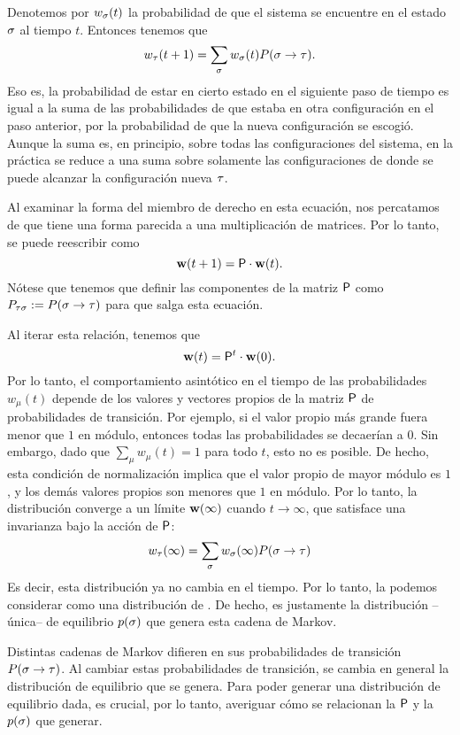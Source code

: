 Denotemos por $w_\ss(t)$ la probabilidad de que el sistema se encuentre en el estado $\ss$ al tiempo $t$. Entonces tenemos que
\begin{equation}
 w_\tt(t+1) = \sum_{\ss} w_\ss(t) P(\ss \to \tt).
\end{equation}
Eso es, la probabilidad de estar en cierto estado en el siguiente paso de tiempo es igual a la suma de las probabilidades de que estaba en otra configuración en el paso anterior, por la probabilidad de que la nueva configuración se escogió.
Aunque la suma es, en principio, sobre todas las configuraciones del sistema, en la práctica se reduce a una suma sobre solamente las configuraciones de donde se puede alcanzar la configuración nueva $\tt$. 

Al examinar la forma del miembro de derecho en esta ecuación, nos percatamos de que tiene una forma parecida a una multiplicación de matrices. Por lo tanto, se puede reescribir como
\begin{equation}
 \ww(t+1) = \PP \cdot \ww(t).
\end{equation}
Nótese que tenemos que definir las componentes de la matriz $\PP$ como $P_{\tt \ss} \defeq P(\ss \to \tt)$ para que salga esta ecuación.

Al iterar esta relación, tenemos que
\begin{equation}
 \ww(t) = \PP^t \cdot \ww(0).
\end{equation}
Por lo tanto, el comportamiento asintótico en el tiempo de las probabilidades $w_\mu(t)$ depende de los valores y vectores propios de la matriz $\PP$ de probabilidades de transición.  Por ejemplo, si el valor propio más grande fuera menor que $1$ en módulo, entonces todas las probabilidades se decaerían a $0$. Sin embargo, dado que $\sum_\mu w_\mu(t) = 1$ para todo $t$, esto no es posible.
De hecho, esta condición de normalización implica que el valor propio de mayor módulo es $1$, y los demás valores propios son menores que $1$ en módulo.  Por lo tanto, la distribución converge a un límite $\ww(\infty)$ cuando $t \to \infty$, que satisface una invarianza bajo la acción de $\PP$:
\begin{equation}
w_\tt(\infty) = \sum_\ss w_\ss(\infty) P(\ss \to \tt)
\end{equation}
Es decir, esta distribución ya no cambia en el tiempo. Por lo tanto, la podemos considerar como una distribución de .
De hecho, es justamente la distribución --única-- de equilibrio $p(\ss)$ que genera esta cadena de Markov.

Distintas cadenas de Markov difieren en sus probabilidades de transición $P(\ss \to \tt)$. Al cambiar estas probabilidades de transición, se cambia en general la distribución de equilibrio que se genera. Para poder generar una distribución de equilibrio dada, es crucial, por lo tanto, averiguar cómo se relacionan la $\PP$ y la $p(\ss)$ que generar.





